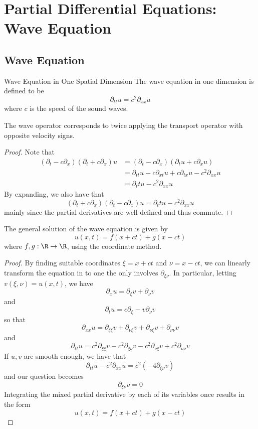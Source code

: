 \documentclass[a4paper]{article}
\begin{document}
\pagebreak
\section{Partial Differential Equations: Wave Equation}
\subsection{Wave Equation}
\begin{defn}{Wave Equation in One Spatial Dimension}{} The wave equation in one dimension is defined to be $$\partial_{tt}u=c^2\partial_{xx}u$$ where $c$ is the speed of the sound waves. 
\end{defn}

\begin{prp}{}{} The wave operator corresponds to twice applying the transport operator with opposite velocity signs.  \tcbline
\begin{proof}
Note that 
\begin{align*}
(\partial_t-c\partial_x)(\partial_t+c\partial_x)u&=(\partial_t-c\partial_x)(\partial_tu+c\partial_xu)\\
&=\partial_{tt}u-c\partial_{xt}u+c\partial_{tx}u-c^2\partial_{xx}u\\
&=\partial_ttu-c^2\partial_{xx}u
\end{align*}
By expanding, we also have that $$(\partial_t+c\partial_x)(\partial_t-c\partial_x)u=\partial_ttu-c^2\partial_{xx}u$$ mainly since the partial derivatives are well defined and thus commute. 
\end{proof}
\end{prp}

\begin{thm}{}{} The general solution of the wave equation is given by $$u(x,t)=f(x+ct)+g(x-ct)$$ where $f,g:\R\to\R$, using the coordinate method. \tcbline
\begin{proof} By finding suitable coordinates $\xi=x+ct$ and $\nu=x-ct$, we can linearly transform the equation in to one the only involves $\partial_{\xi\nu}$. In particular, letting $v(\xi,\nu)=u(x,t)$, we have $$\partial_xu=\partial_\xi v+\partial_\nu v$$ and $$\partial_tu=c\partial_\xi-v\partial_\nu v$$ so that $$\partial_{xx}u=\partial_{\xi\xi}v+\partial_{\nu\xi}v+\partial_{\nu\xi}v+\partial_{\nu\nu}v$$ and $$\partial_{tt}u=c^2\partial_{\xi\xi}v-c^2\partial_{\xi\nu}v-c^2\partial_{\nu\xi}v+c^2\partial_{\nu\nu}v$$ If $u,v$ are smooth enough, we have that $$\partial_{tt}u-c^2\partial_{xx}u=c^2(-4\partial_{\xi\nu}v)$$ and our question becomes $$\partial_{\xi\nu}v=0$$ Integrating the mixed partial derivative by each of its variables once results in the form $$u(x,t)=f(x+ct)+g(x-ct)$$
\end{proof}
\end{thm}
\end{document}
